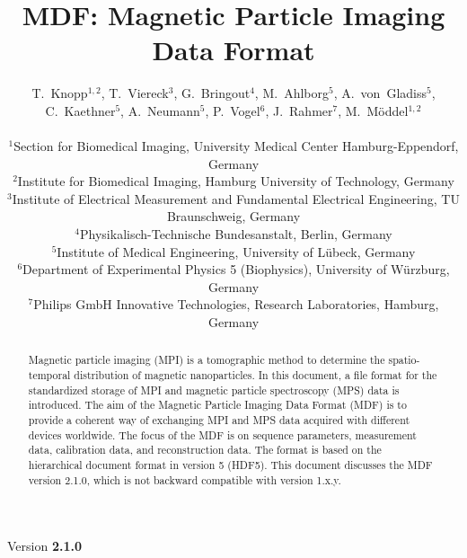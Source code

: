 \documentclass[landscape,a4paper]{article} %
\begin{document}
\title{MDF: Magnetic Particle Imaging Data Format}
\newcommand{\version}{2.1.0}

\author{
T.~Knopp$^{1,2}$, T.~Viereck$^3$, G.~Bringout$^4$, M.~Ahlborg$^5$, A.~von~Gladiss$^5$, C.~Kaethner$^5$, A.~Neumann$^5$, P.~Vogel$^6$, J.~Rahmer$^7$, M.~M\"oddel$^{1,2}$ \\ \\
$^1$Section for Biomedical Imaging, University Medical Center Hamburg-Eppendorf, Germany\\
$^2$Institute for Biomedical Imaging, Hamburg University of Technology, Germany\\
$^3$Institute of Electrical Measurement and Fundamental Electrical Engineering, TU Braunschweig, Germany\\
$^4$Physikalisch-Technische Bundesanstalt, Berlin, Germany\\
$^5$Institute of Medical Engineering, University of  Lübeck, Germany\\
$^6$Department of Experimental Physics 5 (Biophysics), University of Würzburg, Germany\\
$^7$Philips GmbH Innovative Technologies, Research Laboratories, Hamburg, Germany
}

\maketitle
\begin{center}
Version \textbf{\version}
\end{center}

\begin{abstract}
Magnetic particle imaging (MPI) is a tomographic method to determine the spatio-temporal distribution of magnetic nanoparticles. In this document, a file format for the standardized storage of MPI and magnetic particle spectroscopy (MPS) data is introduced. The aim of the Magnetic Particle Imaging Data Format (MDF) is to provide a coherent way of exchanging MPI and MPS data acquired with different devices worldwide. The focus of the MDF is on sequence parameters, measurement data, calibration data, and reconstruction data. The format is based on the hierarchical document format in version 5 (HDF5). This document discusses the MDF version \version, which is not backward compatible with version 1.x.y.
\end{abstract}
\end{document}
